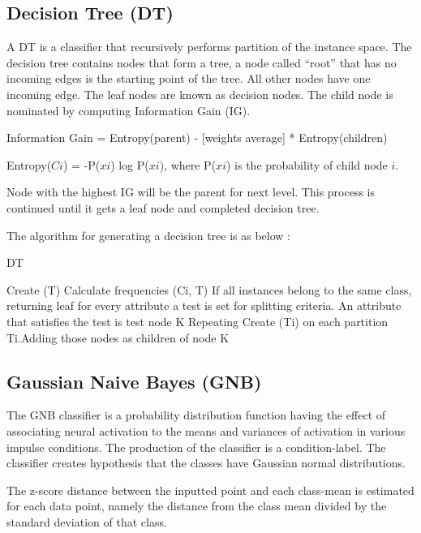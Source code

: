 \subsection{Decision Tree (DT)}
A DT is a classifier that recursively performs partition of the instance space. The decision tree contains nodes that form a tree, a node called “root” that has no incoming edges is the starting point of the tree. All other nodes have one incoming edge. The leaf nodes are known as decision nodes. The child node is nominated by computing Information Gain (IG).

Information Gain = Entropy(parent) - [weights average] * Entropy(children)

Entropy($Ci$) = -P($xi$) log P($xi$), where P($xi$) is the probability of child node $i$. 

Node with the highest IG will be the parent for next level. This process is continued until it gets a leaf node and completed decision tree. 

The algorithm for generating a decision tree is as below :

\begin{algorithm}
\caption{DT}
\label{pseudoPSO1}
\begin{algorithmic}[1]

\State  Create (T) 
\State Calculate frequencies (Ci, T)
\State  If all instances belong to the same class, returning leaf 
\State for every attribute a test is set for splitting criteria. An attribute that satisfies the test is test node K
\State  Repeating Create (Ti) on each partition Ti.Adding those nodes as children of node K

\end{algorithmic}
\end{algorithm}





\subsection{Gaussian Naive Bayes (GNB)}
The GNB classifier is a probability distribution function having the effect of associating neural activation to the means and variances of activation in various impulse conditions. The production of the classifier is a condition-label.  The classifier creates hypothesis that the classes have Gaussian normal distributions.

The z-score distance between the inputted point and each class-mean is estimated for each data point, namely the distance from the class mean divided by the standard deviation of that class.

